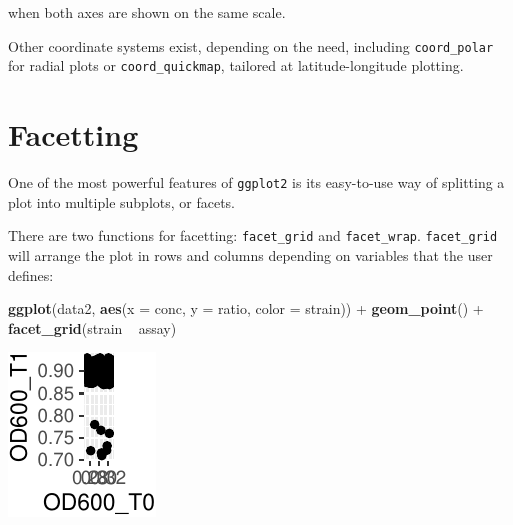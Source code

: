 \documentclass[]{book}
\newenvironment{Shaded}{}{}
\newcommand{\DataTypeTok}[1]{\textcolor[rgb]{0.56,0.13,0.00}{#1}}
\newcommand{\KeywordTok}[1]{\textcolor[rgb]{0.00,0.44,0.13}{\textbf{#1}}}
\newcommand{\NormalTok}[1]{#1}
\newcommand{\OperatorTok}[1]{\textcolor[rgb]{0.40,0.40,0.40}{#1}}
\newcommand{\StringTok}[1]{\textcolor[rgb]{0.25,0.44,0.63}{#1}}
\begin{document}
when both axes are shown on the same scale.

Other coordinate systems exist, depending on the need, including \texttt{coord\_polar} for radial plots or \texttt{coord\_quickmap}, tailored at latitude-longitude plotting.

\hypertarget{facetting}{%
\section{Facetting}\label{facetting}}

One of the most powerful features of \texttt{ggplot2} is its easy-to-use way of splitting a plot into multiple subplots, or facets.

There are two functions for facetting: \texttt{facet\_grid} and \texttt{facet\_wrap}. \texttt{facet\_grid} will arrange the plot in rows and columns depending on variables that the user defines:

\begin{Shaded}
\begin{Highlighting}[]
\KeywordTok{ggplot}\NormalTok{(data2, }\KeywordTok{aes}\NormalTok{(}\DataTypeTok{x =}\NormalTok{ conc, }\DataTypeTok{y =}\NormalTok{ ratio, }\DataTypeTok{color =}\NormalTok{ strain)) }\OperatorTok{+}
\StringTok{  }\KeywordTok{geom_point}\NormalTok{() }\OperatorTok{+}
\StringTok{  }\KeywordTok{facet_grid}\NormalTok{(strain }\OperatorTok{~}\StringTok{ }\NormalTok{assay)}
\end{Highlighting}
\end{Shaded}

\begin{center}\includegraphics[width=\textwidth]{TRES-Tidy-Tutorial_files/figure-latex/unnamed-chunk-130-1} \end{center}
\end{document}
